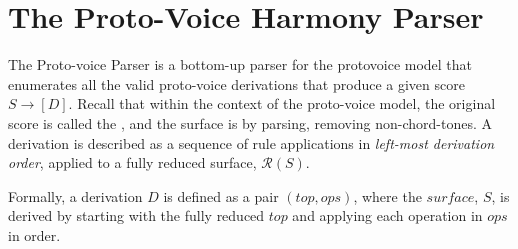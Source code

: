 \documentclass[12pt,a4paper,twoside,openany]{report} \usepackage[pdfborder={0 0 0}]{hyperref}    %
\DeclareMathOperator*{\argmax}{arg\,max} \DeclareMathOperator*{\argmin}{arg\,min}
\theoremstyle{definition} \newtheorem{definition}{Definition}[section]
\begin{document}
%
%
%
%
%
%


      \section{The Proto-Voice Harmony Parser}
      \label{sec:protovoiceHarmonyParser}

      The Proto-voice Parser is a bottom-up parser for the protovoice model that enumerates all the valid
      proto-voice
      derivations that produce a given score $S \to [D]$. Recall that within the context of the proto-voice model, the
      original score is called the , and the surface is  by parsing, removing
      non-chord-tones. A derivation is described as a sequence of rule applications in \textit{left-most derivation
      order}, applied to a fully reduced surface, $\mathcal{R}(S)$. 

      Formally, a derivation $D$ is defined as a pair $(top, ops)$, where the $surface$, $S$, is derived by starting
      with the fully reduced $top$ and applying each operation in $ops$ in order. 
\end{document}
